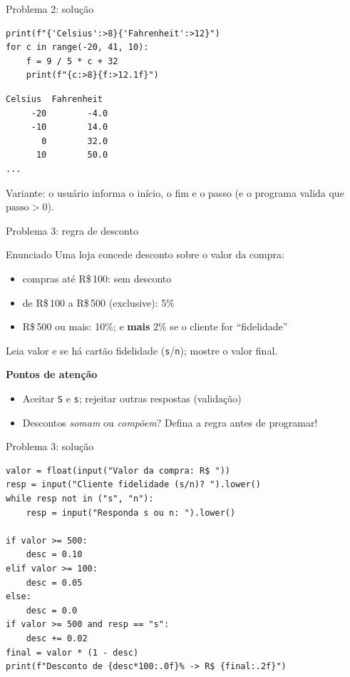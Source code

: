 \documentclass[aspectratio=169,10pt,t]{beamer}
\begin{document}
\begin{frame}[fragile]{Problema 2: solução}
\begin{lstlisting}
print(f"{'Celsius':>8}{'Fahrenheit':>12}")
for c in range(-20, 41, 10):
    f = 9 / 5 * c + 32
    print(f"{c:>8}{f:>12.1f}")
\end{lstlisting}
\begin{lstlisting}[style=saida]
 Celsius  Fahrenheit
     -20        -4.0
     -10        14.0
       0        32.0
      10        50.0
...
\end{lstlisting}
  \small Variante: o usuário informa o início, o fim e o passo (e o programa valida que \(\text{passo}>0\)).
\end{frame}

\begin{frame}{Problema 3: regra de desconto}
  \begin{exampleblock}{Enunciado}
    Uma loja concede desconto sobre o valor da compra:
    \begin{itemize}\small
      \item compras até R\$\,100: sem desconto
      \item de R\$\,100 a R\$\,500 (exclusive): 5\%
      \item R\$\,500 ou mais: 10\%; e \textbf{mais} 2\% se o cliente for ``fidelidade''
    \end{itemize}
    Leia valor e se há cartão fidelidade (\texttt{s}/\texttt{n}); mostre o valor final.
  \end{exampleblock}
  \textbf{Pontos de atenção}
  \begin{itemize}
    \item Aceitar \texttt{S} e \texttt{s}; rejeitar outras respostas (validação)
    \item Descontos \emph{somam} ou \emph{compõem}? Defina a regra antes de programar!
  \end{itemize}
\end{frame}

\begin{frame}[fragile]{Problema 3: solução}
\begin{lstlisting}
valor = float(input("Valor da compra: R$ "))
resp = input("Cliente fidelidade (s/n)? ").lower()
while resp not in ("s", "n"):
    resp = input("Responda s ou n: ").lower()

if valor >= 500:
    desc = 0.10
elif valor >= 100:
    desc = 0.05
else:
    desc = 0.0
if valor >= 500 and resp == "s":
    desc += 0.02
final = valor * (1 - desc)
print(f"Desconto de {desc*100:.0f}% -> R$ {final:.2f}")
\end{lstlisting}
\end{frame}
\end{document}
